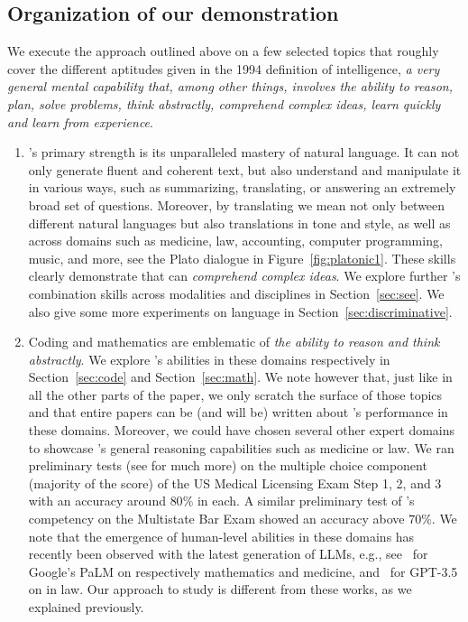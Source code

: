 \subsection{Organization of our demonstration} \label{sec:outline}
We execute the approach outlined above on a few selected topics that roughly cover the different aptitudes given in the 1994 definition of intelligence, {\em a very general mental capability that, among other things, involves the ability to reason, plan, solve problems, think abstractly, comprehend complex ideas, learn quickly and learn from experience}. 
\begin{enumerate}
\item \DV's primary strength is its unparalleled mastery of natural language. It can not only generate fluent and coherent text, but also understand and manipulate it in various ways, such as summarizing, translating, or answering an extremely broad set of questions. Moreover, by translating we mean not only between different natural languages but also translations in tone and style, as well as across domains such as medicine, law, accounting, computer programming, music, and more, see the Plato dialogue in Figure~\ref{fig:platonic1}. These skills clearly demonstrate that {\DV} can {\em comprehend complex ideas}. We explore further {\DV}'s combination skills across modalities and disciplines in Section~\ref{sec:see}. We also give some more experiments on language in Section~\ref{sec:discriminative}.
\item Coding and mathematics are emblematic of {\em the ability to reason and think abstractly}. We explore {\DV}'s abilities in these domains respectively in Section~\ref{sec:code} and Section~\ref{sec:math}. We note however that, just like in all the other parts of the paper, we only scratch the surface of those topics and that entire papers can be (and will be) written about {\DV}'s performance in these domains. Moreover, we could have chosen several other expert domains to showcase {\DV}'s general reasoning capabilities such as medicine or law. We ran preliminary tests (see \cite{gpt4} for much more) on the multiple choice component (majority of the score) of the US Medical Licensing Exam Step 1, 2, and 3 with an accuracy around $80\%$ in each. A similar preliminary test of {\DV}'s competency on the Multistate Bar Exam showed an accuracy above $70\%$. We note that the emergence of human-level abilities in these domains has recently been observed with the latest generation of LLMs, e.g., see~\cite{lewkowycz2022solving, singhal2022large} for Google's PaLM on respectively mathematics and medicine, and~\cite{bommarito2022gpt} for GPT-3.5 on in law. Our approach to study {\DV} is different from these works, as we explained previously.

\end{enumerate}
